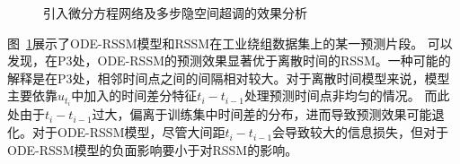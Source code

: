 \begin{figure}[ht]
%
%
\centering
\caption{引入微分方程网络及多步隐空间超调的效果分析}
\label{fig:5_predict_cmp}
\end{figure}
图~\ref{fig:5_predict_cmp}展示了ODE-RSSM模型和RSSM在工业绕组数据集上的某一预测片段。
可以发现，在P3处，ODE-RSSM的预测效果显著优于离散时间的RSSM。一种可能的解释是在P3处，相邻时间点之间的间隔相对较大。对于离散时间模型来说，模型主要依靠$u_{t_i}$中加入的时间差分特征$t_{i}-t_{i-1}$处理预测时间点非均匀的情况。
而此处由于$t_{i}-t_{i-1}$过大，偏离于训练集中时间差的分布，进而导致预测效果可能退化。对于ODE-RSSM模型，尽管大间距$t_{i}-t_{i-1}$会导致较大的信息损失，但对于ODE-RSSM模型的负面影响要小于对RSSM的影响。

